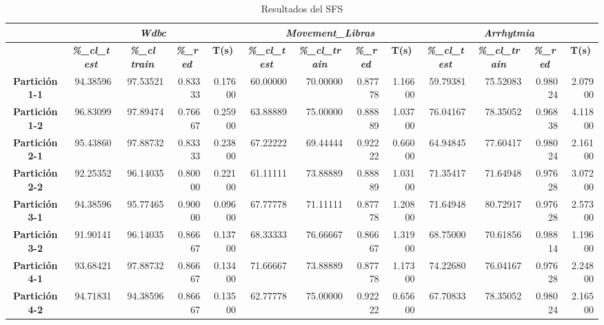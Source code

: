 \documentclass[a4paper,11pt]{article}
\begin{document}
   \begin{table}[htbp]	
    \caption*{Resultados del SFS}
    \begin{adjustbox}{width=1.1\textwidth}
    \begin{tabular}{|c|r|r|r|r|r|r|r|r|r|r|r|r|}
    \hline
    \multicolumn{1}{|l|}{} & \multicolumn{ 4}{c|}{\textbf{\textit{Wdbc}}} & \multicolumn{ 4}{c|}{\textbf{\textit{Movement\_Libras}}} & \multicolumn{ 4}{c|}{\textbf{\textit{Arrhytmia}}} \\ \hline
    \multicolumn{1}{|l|}{} & \multicolumn{1}{c|}{\textbf{\textit{\%\_cl\_test}}} & \multicolumn{1}{c|}{\textbf{\textit{\%\_cl train}}} & \multicolumn{1}{c|}{\textbf{\textit{\%\_red}}} & \multicolumn{1}{c|}{\textbf{T(s)}} & \multicolumn{1}{c|}{\textbf{\textit{\%\_cl\_test}}} & \multicolumn{1}{c|}{\textbf{\textit{\%\_cl\_train}}} & \multicolumn{1}{c|}{\textbf{\textit{\%\_red}}} & \multicolumn{1}{c|}{\textbf{T(s)}} & \multicolumn{1}{c|}{\textbf{\textit{\%\_cl\_test}}} & \multicolumn{1}{c|}{\textbf{\textit{\%\_cl\_train}}} & \multicolumn{1}{c|}{\textbf{\textit{\%\_red}}} & \multicolumn{1}{c|}{\textbf{T(s)}} \\ \hline
    \textbf{Partición 1-1} & 94.38596 & 97.53521 & 0.83333 & 0.17600 & 60.00000 & 70.00000 & 0.87778 & 1.16600 & 59.79381 & 75.52083 & 0.98024 & 2.07900 \\ \hline
    \textbf{Partición 1-2} & 96.83099 & 97.89474 & 0.76667 & 0.25900 & 63.88889 & 75.00000 & 0.88889 & 1.03700 & 76.04167 & 78.35052 & 0.96838 & 4.11800 \\ \hline
    \textbf{Partición 2-1} & 95.43860 & 97.88732 & 0.83333 & 0.23800 & 67.22222 & 69.44444 & 0.92222 & 0.66000 & 64.94845 & 77.60417 & 0.98024 & 2.16100 \\ \hline
    \textbf{Partición 2-2} & 92.25352 & 96.14035 & 0.80000 & 0.22100 & 61.11111 & 73.88889 & 0.88889 & 1.03100 & 71.35417 & 71.64948 & 0.97628 & 3.07200 \\ \hline
    \textbf{Partición 3-1} & 94.38596 & 95.77465 & 0.90000 & 0.09600 & 67.77778 & 71.11111 & 0.87778 & 1.20800 & 71.64948 & 80.72917 & 0.97628 & 2.57300 \\ \hline
    \textbf{Partición 3-2} & 91.90141 & 96.14035 & 0.86667 & 0.13700 & 68.33333 & 76.66667 & 0.86667 & 1.31900 & 68.75000 & 70.61856 & 0.98814 & 1.19600 \\ \hline
    \textbf{Partición 4-1} & 93.68421 & 97.88732 & 0.86667 & 0.13400 & 71.66667 & 73.88889 & 0.87778 & 1.17300 & 74.22680 & 76.04167 & 0.97628 & 2.24800 \\ \hline
    \textbf{Partición 4-2} & 94.71831 & 94.38596 & 0.86667 & 0.13500 & 62.77778 & 75.00000 & 0.92222 & 0.65600 & 67.70833 & 78.35052 & 0.98024 & 2.16500 \\ \hline

\end{tabular}
\end{adjustbox}
\end{table}
\end{document}

